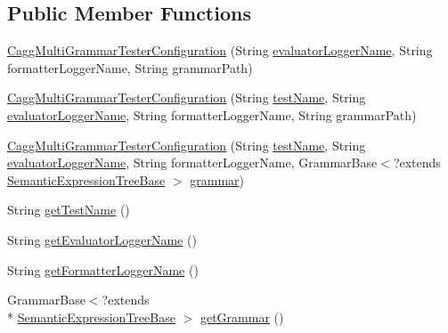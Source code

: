 \subsection*{Public Member Functions}
\begin{DoxyCompactItemize}
\item 
\hyperlink{classit_1_1emarolab_1_1cagg_1_1interfaces_1_1CaggMultiGrammarTesterConfiguration_ad87991b6b871890aae1a5b6c6d42fec5}{Cagg\-Multi\-Grammar\-Tester\-Configuration} (String \hyperlink{classit_1_1emarolab_1_1cagg_1_1interfaces_1_1CaggMultiGrammarTesterConfiguration_ad95451345d9a7ec26774a89bffdc2502}{evaluator\-Logger\-Name}, String formatter\-Logger\-Name, String grammar\-Path)
\item 
\hyperlink{classit_1_1emarolab_1_1cagg_1_1interfaces_1_1CaggMultiGrammarTesterConfiguration_afdbe6855f66d3eaa8d6684449d7d8469}{Cagg\-Multi\-Grammar\-Tester\-Configuration} (String \hyperlink{classit_1_1emarolab_1_1cagg_1_1interfaces_1_1CaggMultiGrammarTesterConfiguration_a0257b98c18078e99c10ab42c4954c2c0}{test\-Name}, String \hyperlink{classit_1_1emarolab_1_1cagg_1_1interfaces_1_1CaggMultiGrammarTesterConfiguration_ad95451345d9a7ec26774a89bffdc2502}{evaluator\-Logger\-Name}, String formatter\-Logger\-Name, String grammar\-Path)
\item 
\hyperlink{classit_1_1emarolab_1_1cagg_1_1interfaces_1_1CaggMultiGrammarTesterConfiguration_a30fa1adc9259dc74535b263d83a1bf16}{Cagg\-Multi\-Grammar\-Tester\-Configuration} (String \hyperlink{classit_1_1emarolab_1_1cagg_1_1interfaces_1_1CaggMultiGrammarTesterConfiguration_a0257b98c18078e99c10ab42c4954c2c0}{test\-Name}, String \hyperlink{classit_1_1emarolab_1_1cagg_1_1interfaces_1_1CaggMultiGrammarTesterConfiguration_ad95451345d9a7ec26774a89bffdc2502}{evaluator\-Logger\-Name}, String formatter\-Logger\-Name, Grammar\-Base$<$?extends \hyperlink{interfaceit_1_1emarolab_1_1cagg_1_1core_1_1evaluation_1_1semanticGrammar_1_1syntaxCompiler_1_1SemanticExpressionTreeBase}{Semantic\-Expression\-Tree\-Base} $>$ \hyperlink{classit_1_1emarolab_1_1cagg_1_1interfaces_1_1CaggMultiGrammarTesterConfiguration_a3deb04a2cc12d4df6830b0523e08dced}{grammar})
\item 
String \hyperlink{classit_1_1emarolab_1_1cagg_1_1interfaces_1_1CaggMultiGrammarTesterConfiguration_a3385a3f52f7460644a9c8ca11b04cfc9}{get\-Test\-Name} ()
\item 
String \hyperlink{classit_1_1emarolab_1_1cagg_1_1interfaces_1_1CaggMultiGrammarTesterConfiguration_a750c18f3e9797740588726892902fcc0}{get\-Evaluator\-Logger\-Name} ()
\item 
String \hyperlink{classit_1_1emarolab_1_1cagg_1_1interfaces_1_1CaggMultiGrammarTesterConfiguration_a2312864754f7d256f436428ae0d6df92}{get\-Formatter\-Logger\-Name} ()
\item 
Grammar\-Base$<$?extends \\*
\hyperlink{interfaceit_1_1emarolab_1_1cagg_1_1core_1_1evaluation_1_1semanticGrammar_1_1syntaxCompiler_1_1SemanticExpressionTreeBase}{Semantic\-Expression\-Tree\-Base} $>$ \hyperlink{classit_1_1emarolab_1_1cagg_1_1interfaces_1_1CaggMultiGrammarTesterConfiguration_a213eade4c256f6a0130e146c69398fde}{get\-Grammar} ()
\end{DoxyCompactItemize}
